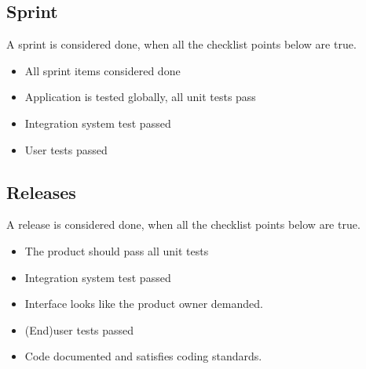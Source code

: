 \documentclass{article}
\begin{document}
\subsection{Sprint}
A sprint is considered done, when all the checklist points below are true.
\begin{itemize}
	\item All sprint items considered done
	\item Application is tested globally, all unit tests pass
	\item Integration system test passed
	\item User tests passed
\end{itemize}
\subsection{Releases}
A release is considered done, when all the checklist points below are true.
\begin{itemize}
	\item The product should pass all unit tests
	\item Integration system test passed
	\item Interface looks like the product owner demanded.
	\item (End)user tests passed
	\item Code documented and satisfies coding standards.
\end{itemize}
\clearpage
\printglossaries
\end{document}
